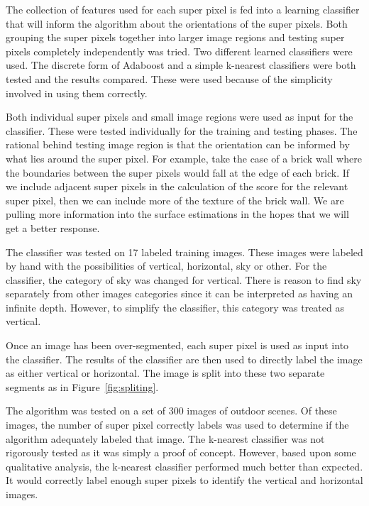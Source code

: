 \documentclass[times,10pt,twocolumn]{article}
\begin{document}
The collection of features used for each super pixel is fed into a learning
classifier that will inform the algorithm about the orientations of the super
pixels. Both grouping the super pixels together into larger image regions and
testing super pixels completely independently was tried. Two different learned
classifiers were used. The discrete form of Adaboost and a simple k-nearest
classifiers were both tested and the results compared. These were used because
of the simplicity involved in using them correctly.

Both individual super pixels and small image regions were used as input for the
classifier. These were tested individually for the training and testing phases.
The rational behind testing image region is that the orientation can be
informed by what lies around the super pixel. For example, take the case of a
brick wall where the boundaries between the super pixels would fall at the edge
of each brick. If we include adjacent super pixels in the calculation of the
score for the relevant super pixel, then we can include more of the texture of
the brick wall. We are pulling more information into the surface estimations in
the hopes that we will get a better response.

The classifier was tested on 17 labeled training images. These images were
labeled by hand with the possibilities of vertical, horizontal, sky or other.
For the classifier, the category of sky was changed for vertical. There is
reason to find sky separately from other images categories since it can be
interpreted as having an infinite depth. However, to simplify the classifier,
this category was treated as vertical.

Once an image has been over-segmented, each super pixel is used as input into
the classifier. The results of the classifier are then used to directly label
the image as either vertical or horizontal. The image is split into these two
separate segments as in Figure~\ref{fig:spliting}.


The algorithm was tested on a set of 300 images of outdoor scenes. Of these
images, the number of super pixel correctly labels was used to determine if the
algorithm adequately labeled that image. The k-nearest classifier was not
rigorously tested as it was simply a proof of concept. However, based upon
some qualitative analysis, the k-nearest classifier performed much better than
expected. It would correctly label enough super pixels to identify the vertical
and horizontal images.
\end{document}
